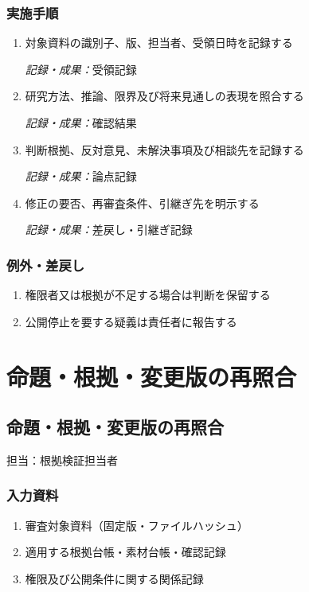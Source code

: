 \documentclass[a4paper,11pt]{article}
\begin{document}
\subsubsection*{実施手順}
\begin{enumerate}[leftmargin=2em,itemsep=0.65em]
\item 対象資料の識別子、版、担当者、受領日時を記録する\par\noindent\textit{記録・成果：}受領記録\nobreak\smallskip
\item 研究方法、推論、限界及び将来見通しの表現を照合する\par\noindent\textit{記録・成果：}確認結果\nobreak\smallskip
\item 判断根拠、反対意見、未解決事項及び相談先を記録する\par\noindent\textit{記録・成果：}論点記録\nobreak\smallskip
\item 修正の要否、再審査条件、引継ぎ先を明示する\par\noindent\textit{記録・成果：}差戻し・引継ぎ記録\nobreak\smallskip
\end{enumerate}
\subsubsection*{例外・差戻し}
\begin{enumerate}[leftmargin=2em,itemsep=0.35em]
\item 権限者又は根拠が不足する場合は判断を保留する
\item 公開停止を要する疑義は責任者に報告する
\end{enumerate}
\section{命題・根拠・変更版の再照合}
\subsection{命題・根拠・変更版の再照合}
\par 担当：根拠検証担当者\par\medskip
\subsubsection*{入力資料}
\begin{enumerate}[leftmargin=2em,itemsep=0.35em]
\item 審査対象資料（固定版・ファイルハッシュ）
\item 適用する根拠台帳・素材台帳・確認記録
\item 権限及び公開条件に関する関係記録
\end{enumerate}
\end{document}
